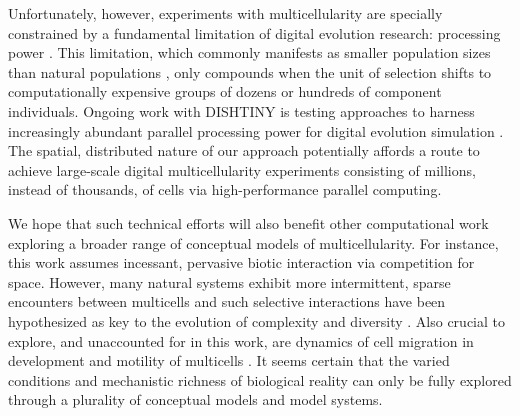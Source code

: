 Unfortunately, however, experiments with multicellularity are specially constrained by a fundamental limitation of digital evolution research: processing power \citep{Moreno_2020}.
This limitation, which commonly manifests as smaller population sizes than natural populations \citep{liard2018complexity}, only compounds when the unit of selection shifts to computationally expensive groups of dozens or hundreds of component individuals.
Ongoing work with DISHTINY is testing approaches to harness increasingly abundant parallel processing power for digital evolution simulation \citep{moreno2021conduit}.
The spatial, distributed nature of our approach potentially affords a route to achieve large-scale digital multicellularity experiments consisting of millions, instead of thousands, of cells via high-performance parallel computing.

We hope that such technical efforts will also benefit other computational work exploring a broader range of conceptual models of multicellularity.
For instance, this work assumes incessant, pervasive biotic interaction via competition for space.
However, many natural systems exhibit more intermittent, sparse encounters between multicells and such selective interactions have been hypothesized as key to the evolution of complexity and diversity \citep{soros2014identifying}.
Also crucial to explore, and unaccounted for in this work, are dynamics of cell migration in development \citep{horwitz2003cell} and motility of multicells \citep{arnellos2019bodily}.
It seems certain that the varied conditions and mechanistic richness of biological reality can only be fully explored through a plurality of conceptual models and model systems.
